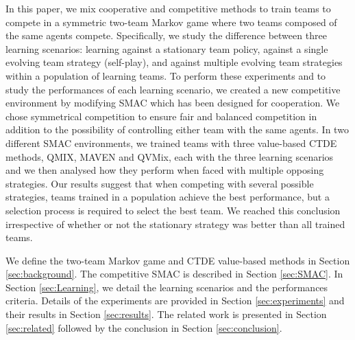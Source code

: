 In this paper, we mix cooperative and competitive methods to train teams to compete in a symmetric two-team Markov game where two teams composed of the same agents compete.
Specifically, we study the difference between three learning scenarios: learning against a stationary team policy, against a single evolving team strategy (self-play), and against multiple evolving team strategies within a population of learning teams.
To perform these experiments and to study the performances of each learning scenario, we created a new competitive environment by modifying SMAC which has been designed for cooperation.
We chose symmetrical competition to ensure fair and balanced competition in addition to the possibility of controlling either team with the same agents. 
In two different SMAC environments, we trained teams with three value-based CTDE methods, QMIX, MAVEN and QVMix, each with the three learning scenarios and we then analysed how they perform when faced with multiple opposing strategies.
Our results suggest that when competing with several possible strategies, teams trained in a population achieve the best performance, but a selection process is required to select the best team.
We reached this conclusion irrespective of whether or not the stationary strategy was better than all trained teams.

We define the two-team Markov game and CTDE value-based methods in Section \ref{sec:background}.
The competitive SMAC is described in Section \ref{sec:SMAC}.
In Section \ref{sec:Learning}, we detail the learning scenarios and the performances criteria.
Details of the experiments are provided in Section \ref{sec:experiments} and their results in Section \ref{sec:results}.
The related work is presented in Section \ref{sec:related} followed by the conclusion in Section \ref{sec:conclusion}.


